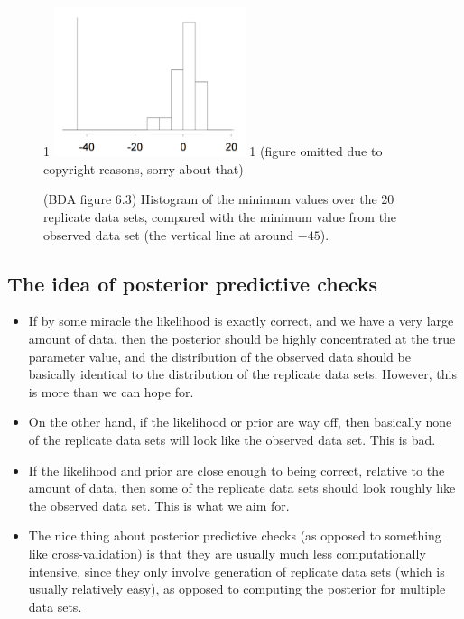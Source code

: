 \documentclass[12pt]{article}
\newcommand{\blind}{1}
\begin{document}
\begin{figure}
\begin{center}
\blind {
\includegraphics[width=0.5\textwidth]{newcomb-min.png}
} \fi
{}\blind { (figure omitted due to copyright reasons, sorry about that) } \fi
\end{center}
\caption{(BDA figure 6.3) Histogram of the minimum values over the 20 replicate data sets, compared with the minimum value from the observed data set (the vertical line at around $-45$).}
\label{figure:newcomb-min}
\end{figure}


\subsection*{The idea of posterior predictive checks}
\begin{itemize}
\item If by some miracle the likelihood is exactly correct, and we have a very large amount of data, then the posterior should be highly concentrated at the true parameter value, and the distribution of the observed data should be basically identical to the distribution of the replicate data sets. However, this is more than we can hope for.
\item On the other hand, if the likelihood or prior are way off, then basically none of the replicate data sets will look like the observed data set. This is bad.
\item If the likelihood and prior are close enough to being correct, relative to the amount of data, then some of the replicate data sets should look roughly like the observed data set. This is what we aim for.
\item The nice thing about posterior predictive checks (as opposed to something like cross-validation) is that they are usually much less computationally intensive, since they only involve generation of replicate data sets (which is usually relatively easy), as opposed to computing the posterior for multiple data sets.
\end{itemize}
\end{document}
